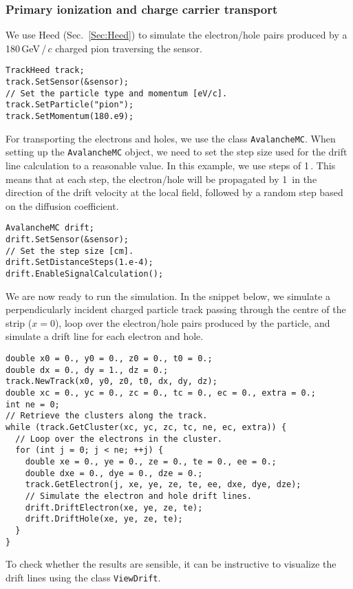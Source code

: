 \subsubsection{Primary ionization and charge carrier transport}

We use Heed (Sec.~\ref{Sec:Heed}) to simulate the electron/hole pairs 
produced by a 180\,GeV\,/\,$c$ charged pion traversing the sensor.
\begin{lstlisting}
TrackHeed track;
track.SetSensor(&sensor);
// Set the particle type and momentum [eV/c].
track.SetParticle("pion");
track.SetMomentum(180.e9);
\end{lstlisting}
For transporting the electrons and holes, we use the class \texttt{AvalancheMC}. 
When setting up the \texttt{AvalancheMC} object, 
we need to set the step size used for the drift line calculation 
to a reasonable value. In this example, we use steps of 1\,. 
This means that at each step, the electron/hole will be propagated by 
1\, in the direction of the drift velocity at the local field, 
followed by a random step based on the diffusion coefficient.
\begin{lstlisting}
AvalancheMC drift;
drift.SetSensor(&sensor);
// Set the step size [cm].
drift.SetDistanceSteps(1.e-4);
drift.EnableSignalCalculation();
\end{lstlisting}
We are now ready to run the simulation. In the snippet below, 
we simulate a perpendicularly incident charged particle track 
passing through the centre of the strip ($x = 0$), 
loop over the electron/hole pairs produced by the particle, 
and simulate a drift line for each electron and hole.
\begin{lstlisting}
double x0 = 0., y0 = 0., z0 = 0., t0 = 0.;
double dx = 0., dy = 1., dz = 0.; 
track.NewTrack(x0, y0, z0, t0, dx, dy, dz);
double xc = 0., yc = 0., zc = 0., tc = 0., ec = 0., extra = 0.;
int ne = 0;
// Retrieve the clusters along the track.
while (track.GetCluster(xc, yc, zc, tc, ne, ec, extra)) {
  // Loop over the electrons in the cluster.
  for (int j = 0; j < ne; ++j) {
    double xe = 0., ye = 0., ze = 0., te = 0., ee = 0.;
    double dxe = 0., dye = 0., dze = 0.;
    track.GetElectron(j, xe, ye, ze, te, ee, dxe, dye, dze);
    // Simulate the electron and hole drift lines.
    drift.DriftElectron(xe, ye, ze, te);
    drift.DriftHole(xe, ye, ze, te);
  }
}
\end{lstlisting}
To check whether the results are sensible, 
it can be instructive to visualize the drift lines 
using the class \texttt{ViewDrift}.
